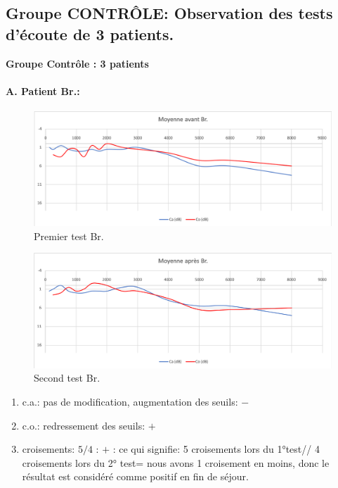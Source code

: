   \subsection{Groupe CONTRÔLE: Observation des tests d'écoute de 3 patients.}


      \textbf{Groupe Contrôle : 3 patients}
  \paragraph{ A. Patient Br.:}
  \begin{figure}[ht]
\centering
\includegraphics[width=0.7\linewidth]{images/graphiques/bru_pre.png}
\caption[Moyenne OG+OD]{Premier test Br.}

\end{figure}



 \begin{figure}[th]
\centering
\includegraphics[width=0.7\linewidth]{images/graphiques/bru_post.png}
\caption[Moyenne OG+OD]{Second test Br.}

\end{figure}

	\begin{enumerate}
 		\item  c.a.: pas de modification, augmentation des
                  seuils: $-$
 		\item  c.o.: redressement des seuils: $+$
 		\item  croisements: $5/4$ : $+$ : ce qui signifie:  5 croisements lors du 1°test// 4 croisements lors du 2° test= nous avons 1 croisement en moins, donc le résultat est considéré comme positif en fin
                  de séjour.
                \end{enumerate}

